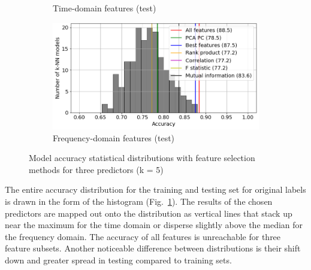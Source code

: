 \begin{figure}[h]
\begin{subfigure}[b]{0.48\textwidth}
        \caption{Time-domain features (test)}
    \end{subfigure}
    \hfill
    \begin{subfigure}[b]{0.48\textwidth}
        \includegraphics[width=\textwidth]{assets/results/feature-combinations/model-distr-fsel-k5-f3-FD-test.png}
        \caption{Frequency-domain features (test)}
    \end{subfigure}
    \caption{Model accuracy statistical distributions with feature selection methods for three predictors (k = 5)}
    \label{fig:evaluation:fsel-model-distr}
\end{figure}

The entire accuracy distribution for the training and testing set for original labels is drawn in the form of the histogram (Fig.~\ref{fig:evaluation:fsel-model-distr}). The results of the chosen predictors are mapped out onto the distribution as vertical lines that stack up near the maximum for the time domain or disperse slightly above the median for the frequency domain. The accuracy of all features is unreachable for three feature subsets. Another noticeable difference between distributions is their shift down and greater spread in testing compared to training sets.

